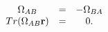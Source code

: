\begin{equation}\label{MCOMP1}
\begin{array}{ccc}
\Omega_{AB} & = & - \Omega_{BA} \\
Tr(\Omega_{AB}{\bf  r}) & = & 0.
\end{array}
\end{equation}

